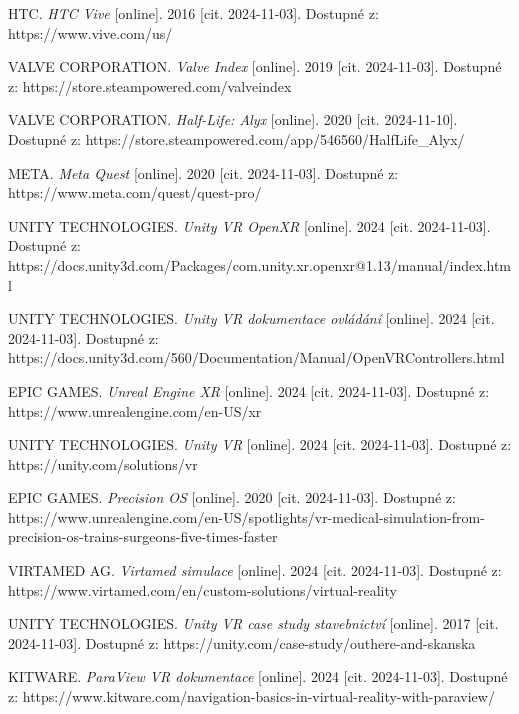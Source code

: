 \documentclass[a4paper,oneside,12pt]{book}
\begin{document}
\clearpage
{} %
\begin{thebibliography}{99}   

HTC. \textit{HTC Vive} [online]. 2016 [cit. 2024-11-03]. Dostupné z: https://www.vive.com/us/

VALVE CORPORATION. \textit{Valve Index} [online]. 2019 [cit. 2024-11-03]. Dostupné z: https://store.steampowered.com/valveindex

VALVE CORPORATION. \textit{Half-Life: Alyx} [online]. 2020 [cit. 2024-11-10]. Dostupné z: https://store.steampowered.com/app/546560/HalfLife\_Alyx/

META. \textit{Meta Quest} [online]. 2020 [cit. 2024-11-03]. Dostupné z: https://www.meta.com/quest/quest-pro/

UNITY TECHNOLOGIES. \textit{Unity VR OpenXR} [online]. 2024 [cit. 2024-11-03]. Dostupné z: https://docs.unity3d.com/Packages/com.unity.xr.openxr@1.13/manual/index.html

UNITY TECHNOLOGIES. \textit{Unity VR dokumentace ovládání} [online]. 2024 [cit. 2024-11-03]. Dostupné z: https://docs.unity3d.com/560/Documentation/Manual/OpenVRControllers.html

EPIC GAMES. \textit{Unreal Engine XR} [online]. 2024 [cit. 2024-11-03]. Dostupné z: https://www.unrealengine.com/en-US/xr

UNITY TECHNOLOGIES. \textit{Unity VR} [online]. 2024 [cit. 2024-11-03]. Dostupné z: https://unity.com/solutions/vr

EPIC GAMES. \textit{Precision OS} [online]. 2020 [cit. 2024-11-03]. Dostupné z: https://www.unrealengine.com/en-US/spotlights/vr-medical-simulation-from-precision-os-trains-surgeons-five-times-faster

VIRTAMED AG. \textit{Virtamed simulace} [online]. 2024 [cit. 2024-11-03]. Dostupné z: https://www.virtamed.com/en/custom-solutions/virtual-reality

UNITY TECHNOLOGIES. \textit{Unity VR case study stavebnictví} [online]. 2017 [cit. 2024-11-03]. Dostupné z: https://unity.com/case-study/outhere-and-skanska

KITWARE. \textit{ParaView VR dokumentace} [online]. 2024 [cit. 2024-11-03]. Dostupné z: https://www.kitware.com/navigation-basics-in-virtual-reality-with-paraview/


\end{thebibliography}
\end{document}
